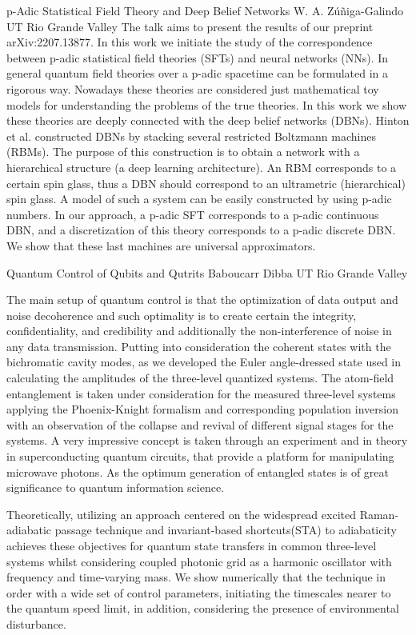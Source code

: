 \begin{addmargin}[2em]{0em}
\vspace{1.5ex}
\abs
{p-Adic Statistical Field Theory and Deep Belief Networks}
{W. A. Zúñiga-Galindo }
{UT Rio Grande Valley}
{The talk aims to present the results of our preprint arXiv:2207.13877. In this work we initiate the study of the correspondence between p-adic statistical field theories (SFTs) and neural networks (NNs). In general quantum field theories over a p-adic spacetime can be formulated in a rigorous way. Nowadays these theories are considered just mathematical toy models for understanding the problems of the true theories. In this work we show these theories are deeply connected with the deep belief networks (DBNs). Hinton et al. constructed DBNs by stacking several restricted Boltzmann machines (RBMs). The purpose of this construction is to obtain a network with a hierarchical structure (a deep learning architecture). An RBM corresponds to a certain spin glass, thus a DBN should correspond to an ultrametric (hierarchical) spin glass. A model of such a system can be easily constructed by using p-adic numbers. In our approach, a p-adic SFT corresponds to a p-adic continuous DBN, and a discretization of this theory corresponds to a p-adic discrete DBN. We show that these last machines are universal approximators.}


\vspace{1.5ex}
\abs
{Quantum Control of Qubits and Qutrits}
{Baboucarr Dibba}
{UT Rio Grande Valley}
{The main setup of quantum control is that the optimization of data output and noise
decoherence and such optimality is to create certain the integrity, confidentiality, and
credibility and additionally the non-interference of noise in any data transmission.
Putting into consideration the coherent states with the bichromatic cavity modes,
as we developed the Euler angle-dressed state used in calculating the amplitudes
of the three-level quantized systems. The atom-field entanglement is taken under
consideration for the measured three-level systems applying the Phoenix-Knight
formalism and corresponding population inversion with an observation of the collapse
and revival of different signal stages for the systems. A very impressive concept is
taken through an experiment and in theory in superconducting quantum circuits, that
provide a platform for manipulating microwave photons. As the optimum generation of
entangled states is of great significance to quantum information science.

Theoretically, utilizing an approach centered on the widespread excited Raman-adiabatic passage
technique and invariant-based shortcuts(STA) to adiabaticity achieves these objectives for quantum state transfers in common three-level systems whilst considering coupled photonic grid as a harmonic oscillator with frequency and time-varying mass. We show numerically that the technique in order with a wide set of control
parameters, initiating the timescales nearer to the quantum speed limit, in addition,
considering the presence of environmental disturbance.}



\end{addmargin}
